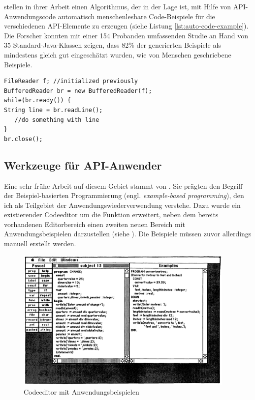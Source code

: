 \begin{important}
\cite{Buse:2012vv} stellen in ihrer Arbeit einen Algorithmus, der in der Lage ist, mit Hilfe von API-Anwendungscode automatisch menschenlesbare Code-Beispiele für die verschiedenen API-Elemente zu erzeugen (siehe Listung \ref{lst:auto-code-example}). Die Forscher konnten mit einer 154 Probanden umfassenden Studie an Hand von 35 Standard-Java-Klassen zeigen, dass 82\% der generierten Beispiele als mindestens gleich gut eingeschätzt wurden, wie von Menschen geschriebene Beispiele.
\end{important}

\begin{center}
\begin{verbatim}
FileReader f; //initialized previously
BufferedReader br = new BufferedReader(f);
while(br.ready()) {
String line = br.readLine();
   //do something with line
}
br.close();
\end{verbatim}
\label{lst:auto-code-example}
\end{center}



\subsection{Werkzeuge für API-Anwender}

Eine sehr frühe Arbeit auf diesem Gebiet stammt von \cite{Neal:1989ef}. Sie prägten den Begriff der Beispiel-basierten Programmierung (engl. \textit{example-based programming}), den ich als Teilgebiet der Anwendungswiederverwendung verstehe. Dazu wurde ein existierender Codeeditor um die Funktion erweitert, neben dem bereits vorhandenen Editorbereich einen zweiten neuen Bereich mit Anwendungsbeispielen darzustellen (siehe ). Die Beispiele müssen zuvor allerdings manuell erstellt werden.

\begin{figure}[!ht]
  \centering
    \includegraphics[width=0.95\textwidth]{Figures/tools/neal.png}
  \caption{Codeeditor mit Anwendungsbeispielen \citep{Neal:1989ef}}
  \label{fig:neal}
\end{figure}


